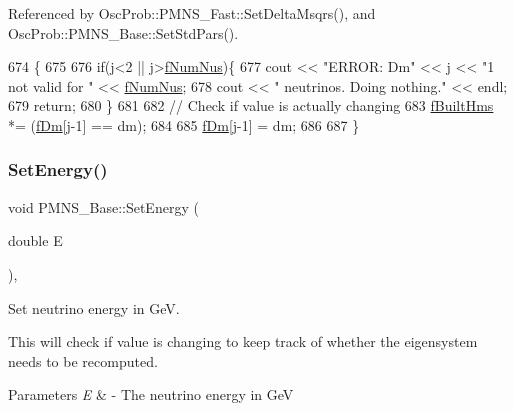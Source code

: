 Referenced by Osc\+Prob\+::\+P\+M\+N\+S\+\_\+\+Fast\+::\+Set\+Delta\+Msqrs(), and Osc\+Prob\+::\+P\+M\+N\+S\+\_\+\+Base\+::\+Set\+Std\+Pars().


\begin{DoxyCode}
674 \{
675 
676   \textcolor{keywordflow}{if}(j<2 || j>\hyperlink{classOscProb_1_1PMNS__Base_a24bb74bed63569dfe88b18fa6a08060e}{fNumNus})\{
677     cout << \textcolor{stringliteral}{"ERROR: Dm"} << j << \textcolor{stringliteral}{"1 not valid for "} << \hyperlink{classOscProb_1_1PMNS__Base_a24bb74bed63569dfe88b18fa6a08060e}{fNumNus};
678     cout << \textcolor{stringliteral}{" neutrinos. Doing nothing."} << endl;
679     \textcolor{keywordflow}{return};
680   \}
681 
682   \textcolor{comment}{// Check if value is actually changing}
683   \hyperlink{classOscProb_1_1PMNS__Base_a9ac3cadeac8db1b90f3152f476244780}{fBuiltHms} *= (\hyperlink{classOscProb_1_1PMNS__Base_a406a31c3b5d620e5a0cace5b411f9f70}{fDm}[j-1] == dm);
684 
685   \hyperlink{classOscProb_1_1PMNS__Base_a406a31c3b5d620e5a0cace5b411f9f70}{fDm}[j-1] = dm;
686 
687 \}
\end{DoxyCode}
\mbox{\label{classOscProb_1_1PMNS__Base_a95b3b0d0cab5e6a54b5ef99587f837c0}} 
\subsubsection{\texorpdfstring{Set\+Energy()}{SetEnergy()}}
{\footnotesize\ttfamily void P\+M\+N\+S\+\_\+\+Base\+::\+Set\+Energy (\begin{DoxyParamCaption}\item[{double}]{E }\end{DoxyParamCaption})\hspace{0.3cm}{\ttfamily [virtual]}, {\ttfamily [inherited]}}

Set neutrino energy in GeV.

This will check if value is changing to keep track of whether the eigensystem needs to be recomputed.


\begin{DoxyParams}{Parameters}
{\em E} & -\/ The neutrino energy in GeV \\
\hline
\end{DoxyParams}


